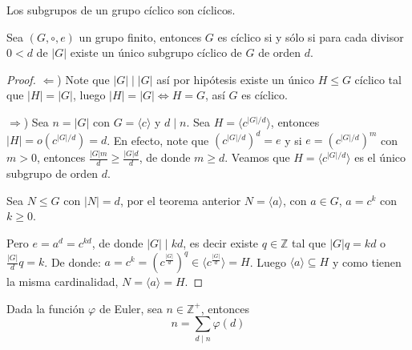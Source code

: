 \begin{prop}
	Los subgrupos de un grupo cíclico son cíclicos.
\end{prop}

\begin{prop}
	Sea $(G, \circ, e)$ un grupo finito, entonces $G$ es cíclico si y sólo si para cada divisor $0 < d$ de $|G|$ existe un único subgrupo cíclico de $G$ de orden $d$.
\end{prop}

\begin{proof}
	$\Leftarrow$) Note que $|G| \mid |G|$ así por hipótesis existe un único $H \le G$ cíclico tal que $|H| = |G|$, luego $|H| = |G| \iff H = G$, así $G$ es cíclico.

	$\Rightarrow$) Sea $n = |G|$ con $G = \langle c \rangle$ y $d \mid n$. Sea $H = \langle c^{|G|/d} \rangle$, entonces $|H| = o(c^{|G|/d}) = d$. En efecto, note que $(c^{|G|/d})^d = e$ y si $e = (c^{|G|/d})^m$ con $m > 0$, entonces $\frac{|G|m}{d} \ge \frac{|G|d}{d}$, de donde $m \ge d$.
	Veamos que $H = \langle c^{|G|/d} \rangle$ es el único subgrupo de orden $d$.

	Sea $N \le G$ con $|N|=d$, por el teorema anterior $N = \langle a \rangle$, con $a \in G$, $a = c^k$ con $k \ge 0$.

	Pero $e = a^d = c^{kd}$, de donde $|G| \mid kd$, es decir existe $q \in \mathbb{Z}$ tal que $|G|q = kd$ o $\frac{|G|}{d}q = k$. De donde: $a = c^k = (c^{\frac{|G|}{d}})^q \in \langle c^{\frac{|G|}{d}} \rangle = H$. Luego $\langle a \rangle \subseteq H$ y como tienen la misma cardinalidad, $N = \langle a \rangle = H$.
\end{proof}

\begin{eje}
	Dada la función $\varphi$ de Euler, sea $n \in \mathbb{Z}^+$, entonces
	\begin{equation*}
		n = \sum_{d \mid n} \varphi(d)
	\end{equation*}

\end{eje}


